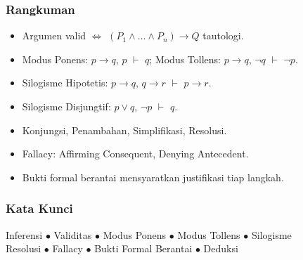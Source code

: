 \documentclass[handout]{beamer}
\theoremstyle{definition}
\theoremstyle{example}
\begin{document}
\begin{frame}
\frametitle{Rangkuman}
\begin{itemize}
  \item Argumen valid $\Leftrightarrow$ $(P_1 \wedge \ldots \wedge P_n) \rightarrow Q$ tautologi.
  \item Modus Ponens: $p \rightarrow q$, $p$ $\vdash$ $q$; Modus Tollens: $p \rightarrow q$, $\neg q$ $\vdash$ $\neg p$.
  \item Silogisme Hipotetis: $p \rightarrow q$, $q \rightarrow r$ $\vdash$ $p \rightarrow r$.
  \item Silogisme Disjungtif: $p \vee q$, $\neg p$ $\vdash$ $q$.
  \item Konjungsi, Penambahan, Simplifikasi, Resolusi.
  \item Fallacy: Affirming Consequent, Denying Antecedent.
  \item Bukti formal berantai mensyaratkan justifikasi tiap langkah.
\end{itemize}
\end{frame}

\begin{frame}
\frametitle{Kata Kunci}
\begin{center}
Inferensi $\bullet$ Validitas $\bullet$ Modus Ponens $\bullet$ Modus Tollens $\bullet$ Silogisme\\
Resolusi $\bullet$ Fallacy $\bullet$ Bukti Formal Berantai $\bullet$ Deduksi
\end{center}
\end{frame}
\end{document}
